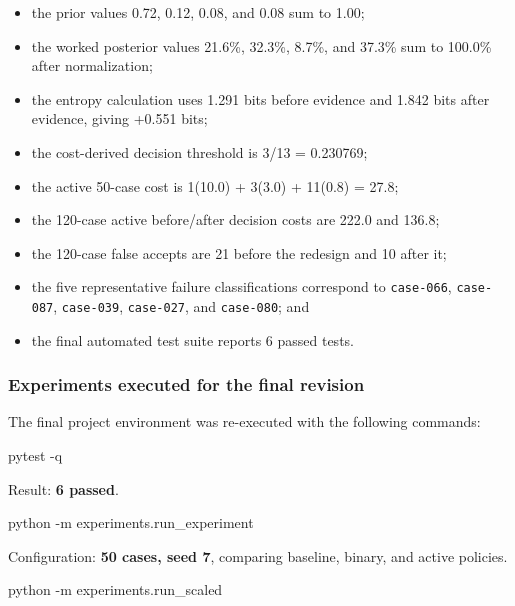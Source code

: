 \documentclass[
]{article}
\newenvironment{Shaded}{}{}
\newcommand{\NormalTok}[1]{#1}
\providecommand{\tightlist}{%
  \setlength{\itemsep}{0pt}\setlength{\parskip}{0pt}}
\begin{document}
\begin{itemize}
\tightlist
\item
  the prior values 0.72, 0.12, 0.08, and 0.08 sum to 1.00;
\item
  the worked posterior values 21.6\%, 32.3\%, 8.7\%, and 37.3\% sum to
  100.0\% after normalization;
\item
  the entropy calculation uses 1.291 bits before evidence and 1.842 bits
  after evidence, giving +0.551 bits;
\item
  the cost-derived decision threshold is 3/13 = 0.230769;
\item
  the active 50-case cost is 1(10.0) + 3(3.0) + 11(0.8) = 27.8;
\item
  the 120-case active before/after decision costs are 222.0 and 136.8;
\item
  the 120-case false accepts are 21 before the redesign and 10 after it;
\item
  the five representative failure classifications correspond to
  \texttt{case-066}, \texttt{case-087}, \texttt{case-039},
  \texttt{case-027}, and \texttt{case-080}; and
\item
  the final automated test suite reports 6 passed tests.
\end{itemize}

\subsubsection{Experiments executed for the final
revision}\label{experiments-executed-for-the-final-revision}

The final project environment was re-executed with the following
commands:

\begin{Shaded}
\begin{Highlighting}[]
\NormalTok{pytest {-}q}
\end{Highlighting}
\end{Shaded}

Result: \textbf{6 passed}.

\begin{Shaded}
\begin{Highlighting}[]
\NormalTok{python {-}m experiments.run\_experiment}
\end{Highlighting}
\end{Shaded}

Configuration: \textbf{50 cases, seed 7}, comparing baseline, binary,
and active policies.

\begin{Shaded}
\begin{Highlighting}[]
\NormalTok{python {-}m experiments.run\_scaled}
\end{Highlighting}
\end{Shaded}
\end{document}
